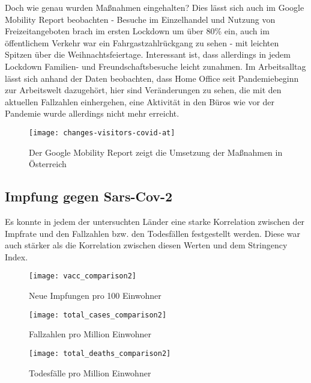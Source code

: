 Doch wie genau wurden Maßnahmen eingehalten? Dies lässt sich auch im Google Mobility Report beobachten - Besuche im Einzelhandel und Nutzung von Freizeitangeboten brach im ersten Lockdown um über 80\% ein, auch im öffentlichem Verkehr war ein Fahrgastzahlrückgang zu sehen - mit leichten Spitzen über die Weihnachtsfeiertage.
Interessant ist, dass allerdings in jedem Lockdown Familien- und Freundschaftsbesuche leicht zunahmen.
Im Arbeitsalltag lässt sich anhand der Daten beobachten, dass Home Office seit Pandemiebeginn zur Arbeitswelt dazugehört, hier sind Veränderungen zu sehen, die mit den aktuellen Fallzahlen einhergehen, eine Aktivität in den Büros wie vor der Pandemie wurde allerdings nicht mehr erreicht. \cite{google-mobility-report}

\begin{figure}[ht]
    \caption{Der Google Mobility Report zeigt die Umsetzung der Maßnahmen in Österreich}
    \label{fig:mobility_index_at}
    \centering
    \texttt{[image: changes-visitors-covid-at]}
\end{figure}

\subsection{Impfung gegen Sars-Cov-2}

Es konnte in jedem der untersuchten Länder eine starke Korrelation zwischen der Impfrate und den Fallzahlen bzw. den Todesfällen festgestellt werden. Diese war auch stärker als die Korrelation zwischen diesen Werten und dem Stringency Index.

\begin{figure}[ht]
    \caption{Neue Impfungen pro 100 Einwohner}
    \label{fig:vaccination_comparison}
    \centering
    \texttt{[image: vacc\_comparison2]}
\end{figure}


\begin{figure}[ht]
    \caption{Fallzahlen pro Million Einwohner}
    \label{fig:cases_comparison}
    \centering
    \texttt{[image: total\_cases\_comparison2]}
\end{figure}


\begin{figure}[ht]
    \caption{Todesfälle pro Million Einwohner}
    \label{fig:death_comparison}
    \centering
    \texttt{[image: total\_deaths\_comparison2]}
\end{figure}

